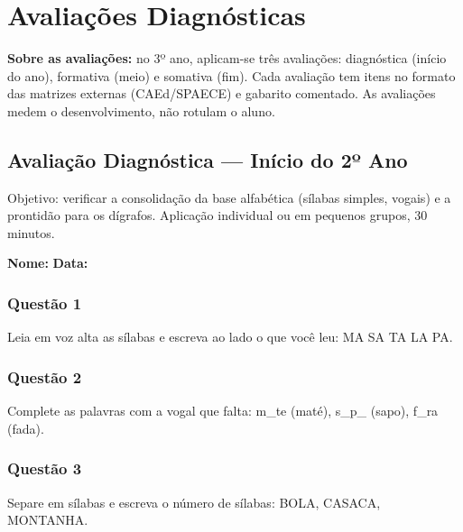 
\chapter{Avaliações Diagnósticas}

\textbf{Sobre as avaliações:} no 3º ano, aplicam-se três avaliações: diagnóstica (início do ano), formativa (meio) e somativa (fim). Cada avaliação tem itens no formato das matrizes externas (CAEd/SPAECE) e gabarito comentado. As avaliações medem o desenvolvimento, não rotulam o aluno.

\section{Avaliação Diagnóstica — Início do 2º Ano}

\begin{avaliacao}
Objetivo: verificar a consolidação da base alfabética (sílabas simples, vogais) e a prontidão para os dígrafos. Aplicação individual ou em pequenos grupos, 30 minutos.
\end{avaliacao}

\noindent\textbf{Nome:} \underline{\hspace{4cm}} \quad \textbf{Data:} \underline{\hspace{2cm}}

\subsection*{Questão 1}
Leia em voz alta as sílabas e escreva ao lado o que você leu: MA  SA  TA  LA  PA.

\begin{center}
  \underline{\hspace{12cm}}
\end{center}

\subsection*{Questão 2}
Complete as palavras com a vogal que falta: m\_te (maté), s\_p\_ (sapo), f\_ra (fada).

\begin{center}
  \underline{\hspace{12cm}}
\end{center}

\subsection*{Questão 3}
Separe em sílabas e escreva o número de sílabas: BOLA, CASACA, MONTANHA.

